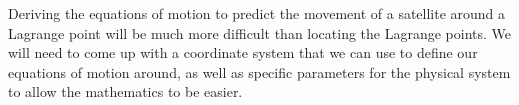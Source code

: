 Deriving the equations of motion to predict the movement of a satellite around a Lagrange point will be much more difficult than locating the Lagrange points.
We will need to come up with a coordinate system that we can use to define our equations of motion around, as well as specific parameters for the physical system to allow the mathematics to be easier. \par
